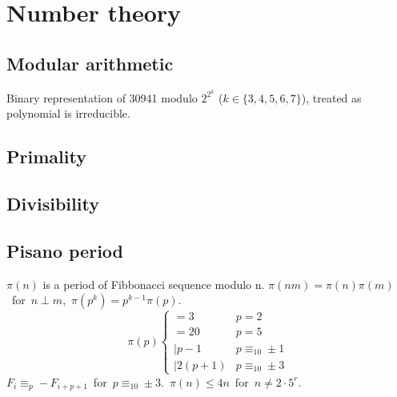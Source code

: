 \chapter{Number theory}

\section{Modular arithmetic}
	Binary representation of 30941 modulo $2^{2^k}$ ($k \in \{3,4,5,6,7\}$), treated as polynomial is irreducible.

\section{Primality}

\section{Divisibility}



\section{Pisano period}
	$\pi(n)$ is a period of Fibbonacci sequence modulo n.
	\mbox{$\pi(nm)=\pi(n)\pi(m)$ for $n \perp m$, $\pi(p^k)=p^{k-1}\pi(p)$.}
	\[\pi(p) \left\{
	\begin{array}{ll}
		=3 & p=2\\
		=20 & p=5\\
		\mid p-1 & p\equiv_{10} \pm 1 \\
		\mid 2(p+1) & p\equiv_{10} \pm 3
	\end{array}\right.\]
	\mbox{$F_i \equiv_p -F_{i+p+1}$ for $p\equiv_{10} \pm 3$. $\pi(n) \le 4n$ for $n\neq 2\cdot 5^r$.}
